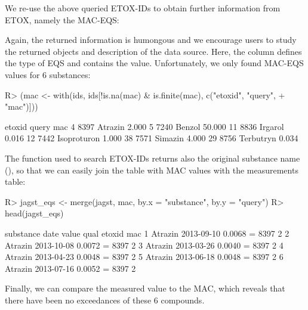 \documentclass[article]{jss}
\begin{document}
We re-use the above queried ETOX-IDs to obtain further information
from ETOX, namely the MAC-EQS:
% 
\begin{CodeChunk}
\end{CodeChunk}
%
Again, the returned information is humongous and we encourage users to study the returned objects and description of the data source.
Here, the column  defines the type of EQS and  contains the value.
Unfortunately, we only found MAC-EQS values for 6 substances:
%
\begin{CodeChunk}
\begin{CodeInput}
R> (mac <- with(ids, ids[!is.na(mac) & is.finite(mac), c("etoxid", "query",
+    "mac")]))
\end{CodeInput}
\begin{CodeOutput}
   etoxid       query    mac
4    8397     Atrazin  2.000
5    7240      Benzol 50.000
11   8836     Irgarol  0.016
12   7442 Isoproturon  1.000
38   7571     Simazin  4.000
29   8756   Terbutryn  0.034
\end{CodeOutput}
\end{CodeChunk}
%
The  function used to search ETOX-IDs returns also
the original substance name (), so that we can easily join
the table with MAC values with the measurements table:
% 
\begin{CodeChunk}
\begin{CodeInput}
R> jagst_eqs <- merge(jagst, mac, by.x = "substance", by.y = "query")
R> head(jagst_eqs)
\end{CodeInput}
\begin{CodeOutput}
  substance       date  value qual etoxid mac
1   Atrazin 2013-09-10 0.0068    =   8397   2
2   Atrazin 2013-10-08 0.0072    =   8397   2
3   Atrazin 2013-03-26 0.0040    =   8397   2
4   Atrazin 2013-04-23 0.0048    =   8397   2
5   Atrazin 2013-06-18 0.0048    =   8397   2
6   Atrazin 2013-07-16 0.0052    =   8397   2
\end{CodeOutput}
\end{CodeChunk}
%
Finally, we can compare the measured value to the MAC, which reveals that there have been no exceedances of these 6 compounds.
\end{document}
